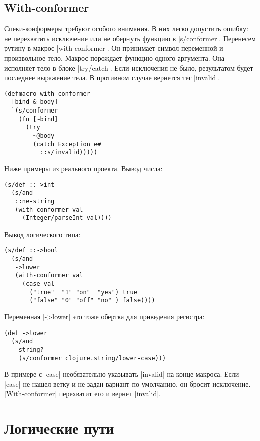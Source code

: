 \subsection{With-conformer}

Спеки-конформеры требуют особого внимания. В них легко допустить ошибку: не
перехватить исключение или не обернуть функцию в \spverb|s/conformer|. Перенесем
рутину в макрос \spverb|with-conformer|. Он принимает символ переменной и
произвольное тело. Макрос порождает функцию одного аргумента. Она исполняет тело
в блоке \spverb|try/catch|. Если исключения не было, результатом будет последнее
выражение тела. В противном случае вернется тег \spverb|invalid|.

\begin{verbatim}
(defmacro with-conformer
  [bind & body]
  `(s/conformer
    (fn [~bind]
      (try
        ~@body
        (catch Exception e#
          ::s/invalid)))))
\end{verbatim}

\noindent
Ниже примеры из реального проекта. Вывод числа:

\begin{verbatim}
(s/def ::->int
  (s/and
   ::ne-string
   (with-conformer val
     (Integer/parseInt val))))
\end{verbatim}

\noindent
Вывод логического типа:

\begin{verbatim}
(s/def ::->bool
  (s/and
   ->lower
   (with-conformer val
     (case val
       ("true"  "1" "on"  "yes") true
       ("false" "0" "off" "no" ) false))))
\end{verbatim}

\noindent
Переменная \spverb|->lower| это тоже обертка для приведения регистра:

\begin{verbatim}
(def ->lower
  (s/and
    string?
    (s/conformer clojure.string/lower-case)))
\end{verbatim}

В примере с \spverb|case| необязательно указывать \spverb|invalid| на конце
макроса. Если \spverb|case| не нашел ветку и не задан вариант по умолчанию, он
бросит исключение. \spverb|With-conformer| перехватит его и вернет
\spverb|invalid|.

\section{Логические пути}

